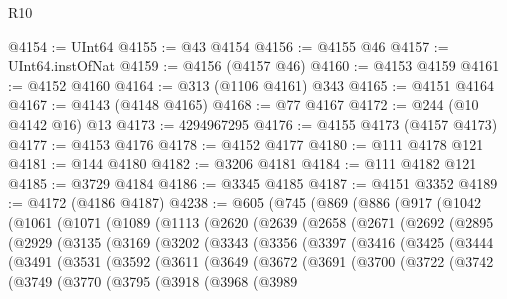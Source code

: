 \begin{lexlean}{R10}
\begin{coremodule}
@4154 := UInt64
@4155 := @43 @4154
@4156 := @4155 @46
@4157 := UInt64.instOfNat
@4159 := @4156 (@4157 @46)
@4160 := @4153 @4159
@4161 := @4152 @4160
@4164 := @313 (@1106 @4161) @343
@4165 := @4151 @4164
@4167 := @4143 (@4148 @4165)
@4168 := @77 @4167
@4172 := @244 (@10 @4142 @16) @13
@4173 := 4294967295
@4176 := @4155 @4173 (@4157 @4173)
@4177 := @4153 @4176
@4178 := @4152 @4177
@4180 := @111 @4178 @121
@4181 := @144 @4180
@4182 := @3206 @4181
@4184 := @111 @4182 @121
@4185 := @3729 @4184
@4186 := @3345 @4185
@4187 := @4151 @3352
@4189 := @4172 (@4186 @4187)
@4238 := @605
    (@745
      (@869
        (@886
          (@917
            (@1042
              (@1061
                (@1071
                  (@1089
                    (@1113
                      (@2620
                        (@2639
                          (@2658
                            (@2671
                              (@2692
                                (@2895
                                  (@2929
                                    (@3135
                                      (@3169
                                        (@3202
                                          (@3343
                                            (@3356
                                              (@3397
                                                (@3416
                                                  (@3425
                                                    (@3444
                                                      (@3491
                                                        (@3531
                                                          (@3592
                                                            (@3611
                                                              (@3649
                                                                (@3672
                                                                  (@3691
                                                                    (@3700
                                                                      (@3722
                                                                        (@3742
                                                                          (@3749
                                                                            (@3770
                                                                              (@3795
                                                                                (@3918
                                                                                  (@3968
                                                                                    (@3989

\end{coremodule}
\end{lexlean}
